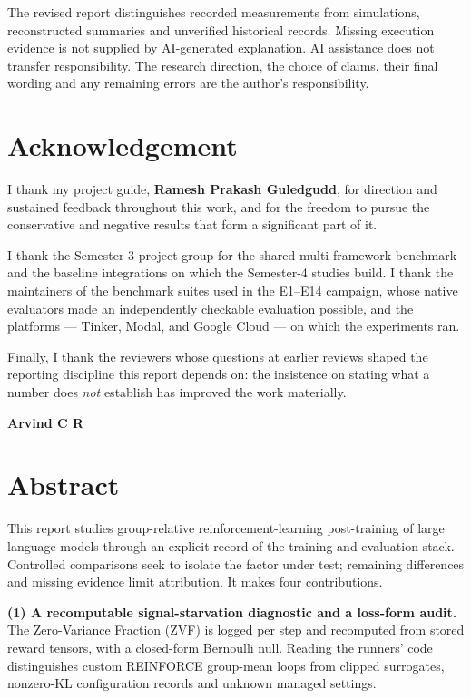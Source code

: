 \documentclass[12pt,a4paper]{report}
\begin{document}
The revised report distinguishes recorded measurements from simulations, reconstructed summaries and unverified historical records. Missing execution evidence is not supplied by AI-generated explanation. AI assistance does not transfer responsibility.
The research direction, the choice of claims, their final wording and any
remaining errors are the author's responsibility.

\chapter*{Acknowledgement}
\thispagestyle{plain}

I thank my project guide, \textbf{Ramesh Prakash Guledgudd}, for direction and
sustained feedback throughout this work, and for the freedom to pursue the
conservative and negative results that form a significant part of it.

I thank the Semester-3 project group for the shared multi-framework benchmark
and the baseline integrations on which the Semester-4 studies build. I thank
the maintainers of the benchmark suites used in the E1--E14 campaign, whose
native evaluators made an independently checkable evaluation possible, and the
platforms --- Tinker, Modal, and Google Cloud --- on which the experiments ran.

Finally, I thank the reviewers whose questions at earlier reviews shaped the
reporting discipline this report depends on: the insistence on stating what a
number does \emph{not} establish has improved the work materially.

\vspace{0.3in}
\noindent\textbf{Arvind C R}

\chapter*{Abstract}
\thispagestyle{plain}

This report studies group-relative reinforcement-learning post-training of
large language models through an explicit record of the training and
evaluation stack. Controlled comparisons seek to isolate the factor under
test; remaining differences and missing evidence limit attribution.
It makes four contributions.

\textbf{(1) A recomputable signal-starvation diagnostic and a loss-form
audit.} The Zero-Variance Fraction (ZVF) is logged per step and recomputed
from stored reward tensors, with a closed-form Bernoulli null. Reading the
runners' code distinguishes custom REINFORCE group-mean loops from clipped
surrogates, nonzero-KL configuration records and unknown managed settings.
\end{document}
